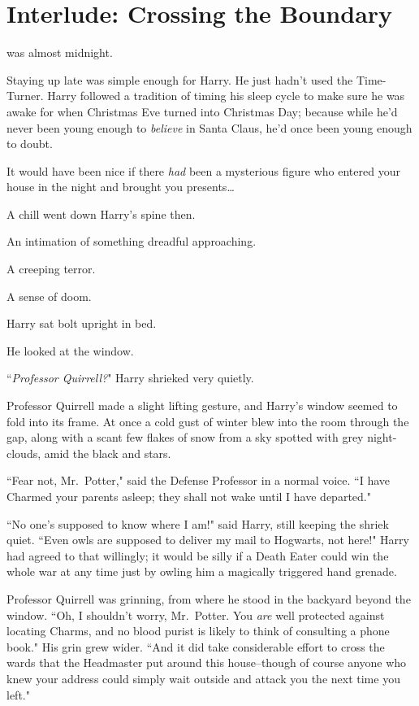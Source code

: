 \chapter{Interlude: Crossing the Boundary}

 was almost midnight.

\hplettrineextrapara
Staying up late was simple enough for Harry. He just hadn't used the Time-Turner. Harry followed a tradition of timing his sleep cycle to make sure he was awake for when Christmas Eve turned into Christmas Day; because while he'd never been young enough to \emph{believe} in Santa Claus, he'd once been young enough to doubt.

It would have been nice if there \emph{had} been a mysterious figure who entered your house in the night and brought you presents{\ldots}

A chill went down Harry's spine then.

An intimation of something dreadful approaching.

A creeping terror.

A sense of doom.

Harry sat bolt upright in bed.

He looked at the window.

``\emph{Professor Quirrell?}" Harry shrieked very quietly.

Professor Quirrell made a slight lifting gesture, and Harry's window seemed to fold into its frame. At once a cold gust of winter blew into the room through the gap, along with a scant few flakes of snow from a sky spotted with grey night-clouds, amid the black and stars.

``Fear not, Mr.~Potter," said the Defense Professor in a normal voice. ``I have Charmed your parents asleep; they shall not wake until I have departed."

``No one's supposed to know where I am!" said Harry, still keeping the shriek quiet. ``Even owls are supposed to deliver my mail to Hogwarts, not here!" Harry had agreed to that willingly; it would be silly if a Death Eater could win the whole war at any time just by owling him a magically triggered hand grenade.

Professor Quirrell was grinning, from where he stood in the backyard beyond the window. ``Oh, I shouldn't worry, Mr.~Potter. You \emph{are} well protected against locating Charms, and no blood purist is likely to think of consulting a phone book." His grin grew wider. ``And it did take considerable effort to cross the wards that the Headmaster put around this house\---though of course anyone who knew your address could simply wait outside and attack you the next time you left."

